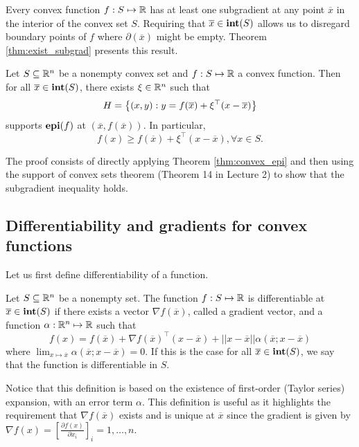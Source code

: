 Every convex function $f : S \mapsto \mathbb{R}$ has at least one subgradient at any point $\overline{x}$ in the interior of the convex set $S$. Requiring that $\overline{x} \in \mathop{\bf int}(S)$ allows us to disregard boundary points of $f$ where $\partial(\overline{x})$ might be empty. Theorem \ref{thm:exist_subgrad} presents this result.
%
\begin{theorem}\label{thm:exist_subgrad}
	Let $S \subseteq \mathbb{R}^n$ be a nonempty convex set and $f:S \mapsto \mathbb{R}$ a convex function. Then for all $\overline{x} \in \mathop{\bf int}(S)$, there exists $\xi\in \mathbb{R}^n$ such that
	$$ H = \left\{ (x,y) : y = f(\overline{x}) + \xi^\top(x - \overline{x}) \right \}$$ supports $\mathop{\bf epi}(f)$ at $(\overline{x}, f(\overline{x}))$. In particular,
	$$f(x) \geq f(\overline{x}) + \xi^\top(x - \overline{x}), \forall x \in S.$$
\end{theorem}
%
The proof consists of directly applying Theorem \ref {thm:convex_epi} and then using the support of convex sets theorem (Theorem 14 in Lecture 2) to show that the subgradient inequality holds.


\subsection{Differentiability and gradients for convex functions} 


Let us first define differentiability of a function.
%
\begin{definition}
	Let $S \subseteq \mathbb{R}^n$ be a nonempty set. The function $f:S \mapsto \mathbb{R}$ is differentiable at $\overline{x} \in \mathop{\bf int}(S)$ if there exists a vector $\nabla f(\overline{x})$, called a gradient vector, and a function $\alpha: \mathbb{R}^n \mapsto \mathbb{R}$ such that 
	$$
	f(x) = f(\overline{x}) + \nabla f(\overline{x})^\top(x - \overline{x}) + ||x-\overline{x}||\alpha(\overline{x};x-\overline{x})
	$$ 
	where $\lim_{x \mapsto \overline{x}}\alpha(\overline{x}; x - \overline{x})=0$. If this is the case for all $\overline{x} \in \mathop{\bf int}(S)$, we say that the function is differentiable in $S$.
\end{definition}
%
Notice that this definition is based on the existence of first-order (Taylor series) expansion, with an error term $\alpha$. This definition is useful as it highlights the requirement that $\nabla f(\overline{x})$ exists and is unique at $\overline{x}$ since the gradient is given by $\nabla f(x) = \left[ \frac{\partial f(x)}{\partial x_i} \right]_i=1,\dots,n$. 

